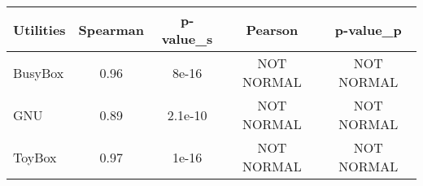 \begin{tabular}{l| c c c c}
\toprule
 Utilities & Spearman & p-value_s & Pearson & p-value_p \\

\midrule
BusyBox & 0.96 & 8e-16 & NOT NORMAL & NOT NORMAL \\
GNU & 0.89 & 2.1e-10 & NOT NORMAL & NOT NORMAL \\
ToyBox & 0.97 & 1e-16 & NOT NORMAL & NOT NORMAL \\
\bottomrule
\end{tabular}
